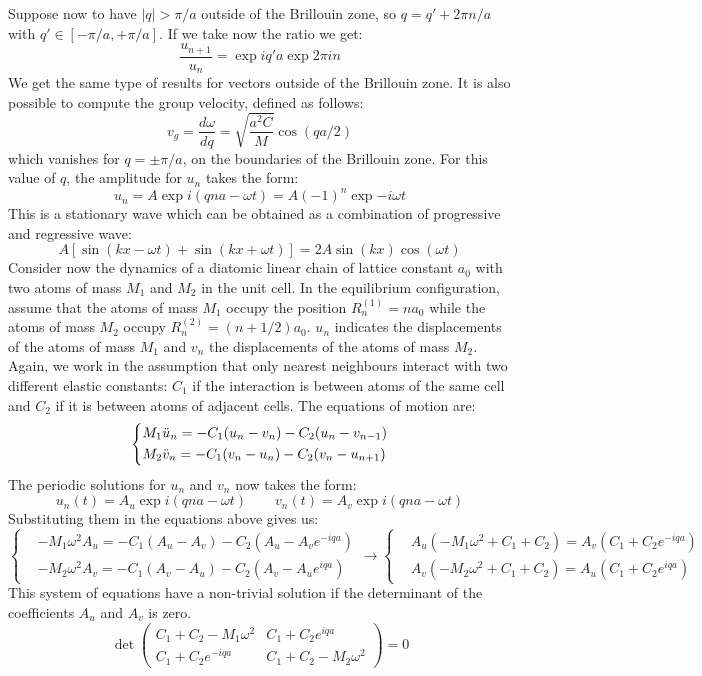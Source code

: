 \documentclass[10.75pt,a4paper,openright,bottom=2cm]{article}
\begin{document}
Suppose now to have $|q|>\pi/a$ outside of the  Brillouin zone, so $q=q'+2\pi n/a$ with $q'\in[-\pi/a,+\pi/a]$. If we take now the ratio we get:
\[
\frac{u_{n+1}}{u_n}=\exp{iq'a}\exp{2\pi in}
\]
We get the same type of results for vectors outside of the  Brillouin zone. It is also possible to compute the group velocity, defined as follows:
\[
v_g=\frac{d\omega}{dq}=\sqrt{\frac{a^2C}{M}}\cos(qa/2)
\]
which vanishes for $q=\pm\pi/a$, on the boundaries of the  Brillouin zone. For this value of $q$, the amplitude for $u_n$ takes the form:
\[
u_n=A\exp{i(qna-\omega t)}=A(-1)^n\exp{-i\omega t}
\]
This is a stationary wave which can be obtained as a combination of progressive and regressive wave:
\[
A[\sin(kx-\omega t)+\sin(kx+\omega t)]=2A\sin(kx)\cos(\omega t)
\]
Consider now the dynamics of a diatomic linear chain of lattice constant $a_0$ with two atoms of mass $M_1$ and $M_2$ in the unit cell. In the equilibrium configuration, assume that the atoms of mass $M_1$ occupy the position $R_n^{(1)}=na_0$ while the atoms of mass $M_2$ occupy $R_n^{(2)}=(n+1/2)a_0$. $u_n$ indicates the displacements of the atoms of mass $M_1$ and $v_n$ the displacements of the atoms of mass $M_2$. Again, we work in the assumption that only nearest neighbours interact with two different elastic constants: $C_1$ if the interaction is between atoms of the same cell and $C_2$ if it is between atoms of adjacent cells. The equations of motion are:
\[
\left\{
\begin{aligned}
&M_1\Ddot{u}_n=-C_1(u_n-v_n)-C_2(u_n-v_{n-1})\\
&M_2\Ddot{v}_n=-C_1(v_n-u_n)-C_2(v_n-u_{n+1})
\end{aligned}
\right.
\]
The periodic solutions for $u_n$ and $v_n$ now takes the form:
\[
u_n(t)=A_u\exp{i(qna-\omega t)} \qquad v_n(t)=A_v\exp{i(qna-\omega t)}
\]
Substituting them in the equations above gives us:
\[
\left\{
\begin{aligned}
&-M_1\omega^2A_u=-C_1(A_u-A_v)-C_2(A_u-A_ve^{-iqa})\\
&-M_2\omega^2A_v=-C_1(A_v-A_u)-C_2(A_v-A_ue^{iqa})
\end{aligned}
\right.
\to
\left\{
\begin{aligned}
&A_u(-M_1\omega^2+C_1+C_2)=A_v(C_1+C_2e^{-iqa})\\
&A_v(-M_2\omega^2+C_1+C_2)=A_u(C_1+C_2e^{iqa})
\end{aligned}
\right.
\]
This system of equations have a non-trivial solution if the determinant of the coefficients $A_u$ and $A_v$ is zero.
\[
\det\left(\begin{array}{cc}
    C_1+C_2-M_1\omega^2 & C_1+C_2e^{iqa} \\
    C_1+C_2e^{-iqa} & C_1+C_2-M_2\omega^2
\end{array}\right)=0
\]
\end{document}
